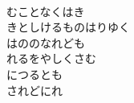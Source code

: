 \documentclass[10pt,b5j]{tarticle} %
\begin{document}
\begin{enumerate}
\begin{minipage}[c]{\blocksize}
        \vspace{\linespace}
        \item~\\
        むことなくはき\\
        きとしけるものはりゆく\\
        はののなれども\\
        れるをやしくさむ\\
        につるとも\\
        されどにれ
    
    \end{minipage}
\end{enumerate} %
\end{document}
